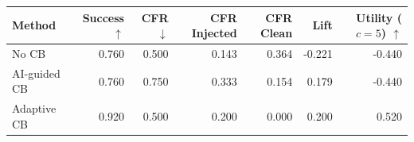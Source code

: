 \begin{tabular}{lrrrrrr}
\toprule
Method & Success $\uparrow$ & CFR $\downarrow$ & CFR Injected & CFR Clean & Lift & Utility ($c=5$) $\uparrow$ \\
\midrule
No CB & 0.760 & 0.500 & 0.143 & 0.364 & -0.221 & -0.440 \\
AI-guided CB & 0.760 & 0.750 & 0.333 & 0.154 & 0.179 & -0.440 \\
Adaptive CB & 0.920 & 0.500 & 0.200 & 0.000 & 0.200 & 0.520 \\
\bottomrule
\end{tabular}
